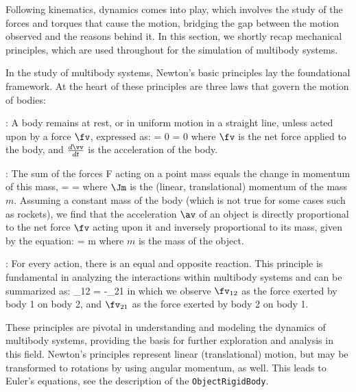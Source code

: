 Following kinematics, dynamics comes into play, which involves the study of the forces and torques that cause the motion, bridging the gap between the motion observed and the reasons behind it.
In this section, we shortly recap mechanical principles, which are used throughout for the simulation of multibody systems.

In the study of multibody systems, Newton's basic principles lay the foundational framework. At the heart of these principles are three laws that govern the motion of bodies:

\noindent {}: A body remains at rest, or in uniform motion in a straight line, unless acted upon by a force $\fv$, expressed as:
\be
  \fv = 0 \implies {} = 0
\ee
where $\fv$ is the net force applied to the body, and $\frac{d\vv}{dt}$ is the acceleration of the body.

\noindent{}: The sum of the forces F acting on a point mass equals the change in momentum of this mass, 
\be
  \fv=  = \dot \Jm 
\ee
where $\Jm$ is the (linear, translational) momentum of the mass $m$. Assuming a constant mass of the body (which is not true for some cases such as rockets), we find that the acceleration $\av$ of an object is directly proportional to the net force $\fv$ acting upon it and inversely proportional to its mass, given by the equation:
\be \label{eq:theory:newton:fma}
  \fv= m \av
\ee
where $m$ is the mass of the object.
  
\noindent {}: For every action, there is an equal and opposite reaction. This principle is fundamental in analyzing the interactions within multibody systems and can be summarized as:
\be
  \fv_{12} = -\fv_{21}
\ee
in which we observe $\fv_{12}$ as the force exerted by body 1 on body 2, and $\fv_{21}$ as the force exerted by body 2 on body 1.

These principles are pivotal in understanding and modeling the dynamics of multibody systems, providing the basis for further exploration and analysis in this field.
Newton's principles represent linear (translational) motion, but may be transformed to rotations by using angular momentum, as well. This leads to Euler's equations, see the description of the \texttt{ObjectRigidBody}.

